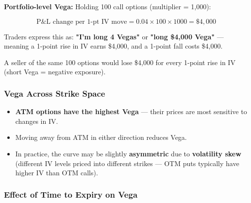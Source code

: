 \documentclass[12pt,openany]{book}
\begin{document}
\textbf{Portfolio-level Vega:}
Holding 100 call options (multiplier = 1,000):

\[
\text{P\&L change per 1-pt IV move} = 0.04 \times 100 \times 1000 = \$4{,}000
\]

Traders express this as: \textbf{"I'm long 4 Vegas"} or \textbf{"long \$4,000 Vega"} — meaning a 1-point rise in IV earns \$4,000, and a 1-point fall costs \$4,000.

A seller of the same 100 options would lose \$4,000 for every 1-point rise in IV (short Vega = negative exposure).

\subsubsection{Vega Across Strike Space}


\begin{center}
\end{center}


\begin{itemize}[leftmargin=*]
    \item \textbf{ATM options have the highest Vega} — their prices are most sensitive to changes in IV.
    \item Moving away from ATM in either direction reduces Vega.
    \item In practice, the curve may be slightly \textbf{asymmetric} due to \textbf{volatility skew} (different IV levels priced into different strikes — OTM puts typically have higher IV than OTM calls).
\end{itemize}

\subsubsection{Effect of Time to Expiry on Vega}
\end{document}
